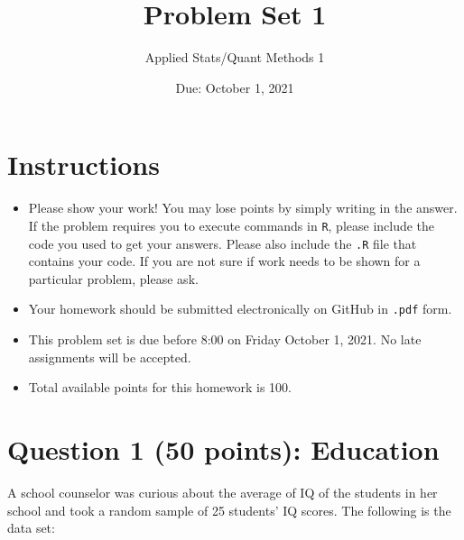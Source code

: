\documentclass[12pt,letterpaper]{article}
\title{Problem Set 1}
\date{Due: October 1, 2021}
\author{Applied Stats/Quant Methods 1}
\begin{document}
	\maketitle
	
	\section*{Instructions}
	\begin{itemize}
		\item Please show your work! You may lose points by simply writing in the answer. If the problem requires you to execute commands in \texttt{R}, please include the code you used to get your answers. Please also include the \texttt{.R} file that contains your code. If you are not sure if work needs to be shown for a particular problem, please ask.
		\item Your homework should be submitted electronically on GitHub in \texttt{.pdf} form.
		\item This problem set is due before 8:00 on Friday October 1, 2021. No late assignments will be accepted.
		\item Total available points for this homework is 100.
	\end{itemize}
	
	\vspace{1cm}
	\section*{Question 1 (50 points): Education}

A school counselor was curious about the average of IQ of the students in her school and took a random sample of 25 students' IQ scores. The following is the data set:\\
\vspace{.5cm}

  

\vspace{1cm}
\end{document}
